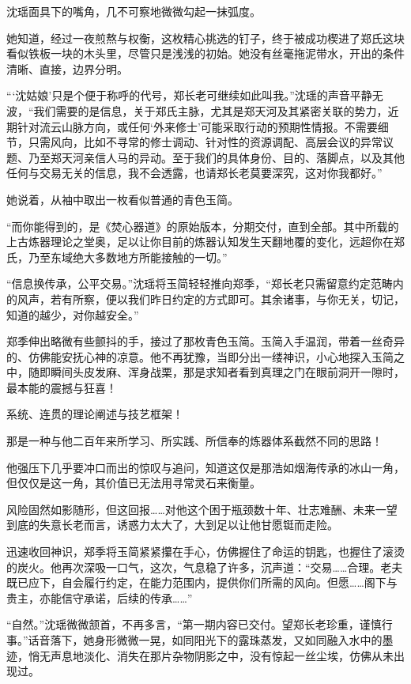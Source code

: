 沈瑶面具下的嘴角，几不可察地微微勾起一抹弧度。

她知道，经过一夜煎熬与权衡，这枚精心挑选的钉子，终于被成功楔进了郑氏这块看似铁板一块的木头里，尽管只是浅浅的初始。她没有丝毫拖泥带水，开出的条件清晰、直接，边界分明。

“‘沈姑娘’只是个便于称呼的代号，郑长老可继续如此叫我。”沈瑶的声音平静无波，“我们需要的是信息，关于郑氏主脉，尤其是郑天河及其紧密关联的势力，近期针对流云山脉方向，或任何‘外来修士’可能采取行动的预期性情报。不需要细节，只需风向，比如不寻常的修士调动、针对性的资源调配、高层会议的异常议题、乃至郑天河亲信人马的异动。至于我们的具体身份、目的、落脚点，以及其他任何与交易无关的信息，我不会透露，也请郑长老莫要深究，这对你我都好。”

她说着，从袖中取出一枚看似普通的青色玉简。

“而你能得到的，是《焚心器道》的原始版本，分期交付，直到全部。其中所载的上古炼器理论之堂奥，足以让你目前的炼器认知发生天翻地覆的变化，远超你在郑氏，乃至东域绝大多数地方所能接触的一切。”

“信息换传承，公平交易。”沈瑶将玉简轻轻推向郑季，“郑长老只需留意约定范畴内的风声，若有所察，便以我们昨日约定的方式即可。其余诸事，与你无关，切记，知道的越少，对你越安全。”

郑季伸出略微有些颤抖的手，接过了那枚青色玉简。玉简入手温润，带着一丝奇异的、仿佛能安抚心神的凉意。他不再犹豫，当即分出一缕神识，小心地探入玉简之中，随即瞬间头皮发麻、浑身战栗，那是求知者看到真理之门在眼前洞开一隙时，最本能的震撼与狂喜！

系统、连贯的理论阐述与技艺框架！

那是一种与他二百年来所学习、所实践、所信奉的炼器体系截然不同的思路！

他强压下几乎要冲口而出的惊叹与追问，知道这仅是那浩如烟海传承的冰山一角，但仅仅是这一角，其价值已无法用寻常灵石来衡量。

风险固然如影随形，但这回报……对他这个困于瓶颈数十年、壮志难酬、未来一望到底的失意长老而言，诱惑力太大了，大到足以让他甘愿铤而走险。

迅速收回神识，郑季将玉简紧紧攥在手心，仿佛握住了命运的钥匙，也握住了滚烫的炭火。他再次深吸一口气，这次，气息稳了许多，沉声道：“交易……合理。老夫既已应下，自会履行约定，在能力范围内，提供你们所需的风向。但愿……阁下与贵主，亦能信守承诺，后续的传承……”

“自然。”沈瑶微微颔首，不再多言，“第一期内容已交付。望郑长老珍重，谨慎行事。”话音落下，她身形微微一晃，如同阳光下的露珠蒸发，又如同融入水中的墨迹，悄无声息地淡化、消失在那片杂物阴影之中，没有惊起一丝尘埃，仿佛从未出现过。

